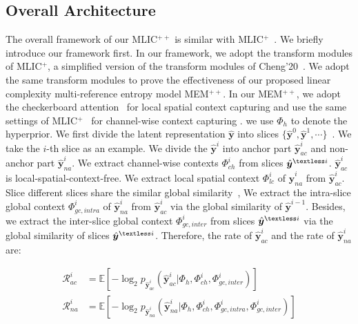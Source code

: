 \documentclass{article}
\theoremstyle{plain}
\theoremstyle{definition}
\theoremstyle{remark}
\begin{document}
  \subsection{Overall Architecture}
  \label{sec:method:overview}
  The overall framework of our MLIC$^{++}$ is similar with
  MLIC$^+$~\cite{jiang2022mlic}. We briefly introduce our framework first.
  In our framework, we adopt the transform modules of MLIC$^+$,
  a simplified version of the transform modules of Cheng'20~\cite{cheng2020learned}.
  We adopt the same transform modules to prove the effectiveness of 
  our proposed linear complexity multi-reference entropy model MEM$^{++}$.
  In our MEM$^{++}$, we adopt the checkerboard attention~\cite{jiang2022mlic} for local spatial
  context capturing and use the same settings of MLIC$^{+}$~\cite{jiang2022mlic} 
  for channel-wise context capturing .
  we use $\Phi_{h}$ to denote the hyperprior. 
  We first divide the latent representation $\hat{\boldsymbol{y}}$
  into slices $\{\hat{\boldsymbol{y}}^0,\hat{\boldsymbol{y}}^1,\cdots \}$~\cite{minnen2020channel}.
  We take the $i$-th slice as an example. We divide the $\hat{\boldsymbol{y}}^i$
  into anchor part $\hat{\boldsymbol{y}}_{ac}^i$ and non-anchor part
  $\hat{\boldsymbol{y}}_{na}^i$. We extract channel-wise contexts
  $\Phi_{ch}^i$ from slices $\hat{\boldsymbol{y}}^{\textless i}$.
  $\hat{\boldsymbol{y}}_{ac}^i$ is local-spatial-context-free.
  We extract local spatial context $\Phi_{lc}^i$ of $\hat{\boldsymbol{y}}_{na}^i$
  from $\hat{\boldsymbol{y}}_{ac}^i$. Slice different slices 
  share the similar global similarity~\cite{jiang2022mlic,guo2021causal},
We extract the intra-slice global context $\Phi^{i}_{gc,intra}$
  of $\hat{\boldsymbol{y}}_{na}^i$ from $\hat{\boldsymbol{y}}_{ac}^i$
  via the global similarity of $\hat{\boldsymbol{y}}^{i-1}$.
  Besides, we extract the inter-slice global context $\Phi^{i}_{gc,inter}$
  from slices $\hat{\boldsymbol{y}}^{\textless i}$ via the
  global similarity of slices $\hat{\boldsymbol{y}}^{\textless i}$.
  Therefore, the rate of $\hat{\boldsymbol{y}}^i_{ac}$ and 
  the rate of $\hat{\boldsymbol{y}}^i_{na}$ are:
  \begin{small}
  \begin{equation}
  \begin{aligned}
      \mathcal{R}^i_{ac} &= \mathbb{E}\left[-\log_2p_{\hat{\boldsymbol{y}}^i_{ac}}\left(\hat{\boldsymbol{y}}^i_{ac}|\Phi_{h}, \Phi_{ch}^i, \Phi_{gc,inter}^i \right) \right]\\   
      \mathcal{R}^i_{na} &= \mathbb{E}\left[-\log_2p_{\hat{\boldsymbol{y}}^i_{na}}\left(\hat{\boldsymbol{y}}^i_{na}|\Phi_{h}, \Phi_{ch}^i, \Phi_{gc,intra}^i, \Phi_{gc,inter}^i \right) \right]
  \end{aligned}
  \end{equation}
  \end{small}
\end{document}
